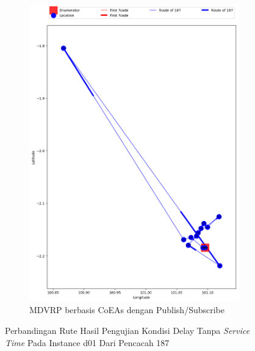 \begin{figure}[H]\ContinuedFloat
	\centering
	\begin{subfigure}[t]{\textwidth}
		\centering
		\includegraphics[width=\textwidth]{Resources/Images/delayed_1/real_m15_n100_delayed_1_187_pubsub_coes}
		\caption{MDVRP berbasis CoEAs dengan Publish/Subscribe}
		\label{fig:real_m15_n100_delayed_1_187_pubsub_coes}
	\end{subfigure}
	\caption{Perbandingan Rute Hasil Pengujian Kondisi Delay Tanpa \textit{Service Time} Pada Instance d01 Dari Pencacah 187}
	\label{fig:real_m15_n100_delayed_1_187_contd}
\end{figure}


